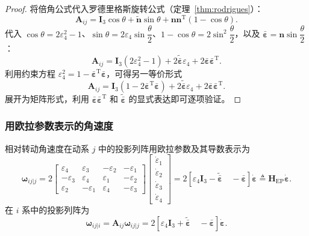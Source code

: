\begin{proof}
	将倍角公式代入罗德里格斯旋转公式（定理~\ref{thm:rodrigues}）：
	$$
	\boldsymbol{A}_{ij}=\boldsymbol{I}_3\cos\theta+\tilde{\boldsymbol{n}}\sin\theta+\boldsymbol{n}\boldsymbol{n}^{\mathrm{T}}(1-\cos\theta).
	$$
	代入 $\cos\theta=2\varepsilon_4^2-1$、$\sin\theta=2\varepsilon_4\sin\dfrac{\theta}{2}$、$1-\cos\theta=2\sin^2\dfrac{\theta}{2}$，以及 $\bar{\boldsymbol{\varepsilon}}=\boldsymbol{n}\sin\dfrac{\theta}{2}$：
	$$
	\boldsymbol{A}_{ij}=\boldsymbol{I}_3(2\varepsilon_4^2-1)+2\tilde{\bar{\boldsymbol{\varepsilon}}}\varepsilon_4+2\bar{\boldsymbol{\varepsilon}}\bar{\boldsymbol{\varepsilon}}^{\mathrm{T}}.
	$$
	利用约束方程 $\varepsilon_4^2=1-\bar{\boldsymbol{\varepsilon}}^{\mathrm{T}}\bar{\boldsymbol{\varepsilon}}$，可得另一等价形式
	$$
	\boldsymbol{A}_{ij}=\boldsymbol{I}_3(1-2\bar{\boldsymbol{\varepsilon}}^{\mathrm{T}}\bar{\boldsymbol{\varepsilon}})+2\tilde{\bar{\boldsymbol{\varepsilon}}}\varepsilon_4+2\bar{\boldsymbol{\varepsilon}}\bar{\boldsymbol{\varepsilon}}^{\mathrm{T}}.
	$$
	展开为矩阵形式，利用 $\bar{\boldsymbol{\varepsilon}}\bar{\boldsymbol{\varepsilon}}^{\mathrm{T}}$ 和 $\tilde{\bar{\boldsymbol{\varepsilon}}}$ 的显式表达即可逐项验证。
\end{proof}

\subsubsection{用欧拉参数表示的角速度}

\begin{theorem}[欧拉参数表示的角速度]\label{thm:omega-euler-params}
	相对转动角速度在动系 $j$ 中的投影列阵用欧拉参数及其导数表示为
	$$
	\boldsymbol{\omega}_{ij|j}=2
	\begin{bmatrix}
		\varepsilon_4 & \varepsilon_3 & -\varepsilon_2 & -\varepsilon_1\\
		-\varepsilon_3 & \varepsilon_4 & \varepsilon_1 & -\varepsilon_2\\
		\varepsilon_2 & -\varepsilon_1 & \varepsilon_4 & -\varepsilon_3
	\end{bmatrix}
	\begin{bmatrix}
		\dot{\varepsilon}_1\\ \dot{\varepsilon}_2\\ \dot{\varepsilon}_3\\ \dot{\varepsilon}_4
	\end{bmatrix}
	=2\left[\varepsilon_4\boldsymbol{I}_3-\tilde{\bar{\boldsymbol{\varepsilon}}}\quad -\bar{\boldsymbol{\varepsilon}}\right]\dot{\boldsymbol{\varepsilon}}
	\triangleq\boldsymbol{H}_{\mathrm{EP}}\dot{\boldsymbol{\varepsilon}}.
	$$
	在 $i$ 系中的投影列阵为
	$$
	\boldsymbol{\omega}_{ij|i}=\boldsymbol{A}_{ij}\boldsymbol{\omega}_{ij|j}
	=2\left[\varepsilon_4\boldsymbol{I}_3+\tilde{\bar{\boldsymbol{\varepsilon}}}\quad -\bar{\boldsymbol{\varepsilon}}\right]\dot{\boldsymbol{\varepsilon}}.
	$$
\end{theorem}

